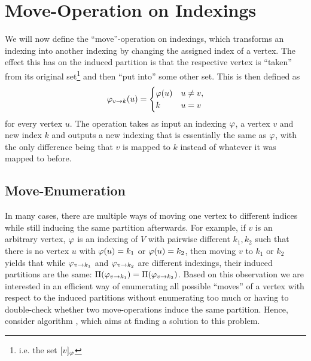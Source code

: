 \section{Move-Operation on Indexings}\label{sec:move-operation}

We will now define the ``move''-operation on indexings, which transforms an indexing into another indexing by changing the assigned index of a vertex. The effect this has on the induced partition is that the respective vertex is ``taken'' from its original set\footnote{i.e. the set $[v]_\varphi$} and then ``put into'' some other set. This is then defined as
\begin{equation} 
\varphi_{ v\rightarrow  k}(u) = \begin{cases}
    \varphi(u) & u \neq v, \\ 
    k & u = v
\end{cases} \label{eq:move-operation}
\end{equation} 
for every vertex $u$. The operation takes as input an indexing $\varphi$, a vertex $v$ and new index $k$ and outputs a new indexing that is essentially the same as $\varphi$, with the only difference being that $v$ is mapped to $k$ instead of whatever it was mapped to before.

\subsection{Move-Enumeration}

In many cases, there are multiple ways of moving one vertex to different indices while still inducing the same partition afterwards. For example, if $v$ is an arbitrary vertex, $\varphi$ is an indexing of $V$ with pairwise different $k_1,k_2$ such that there is no vertex $u$ with $\varphi(u) = k_1$ or $\varphi(u) = k_2$, then moving $v$ to $k_1$ or $k_2$ yields that while $\varphi_{v\rightarrow k_1}$ and $\varphi_{v\rightarrow k_2}$ are different indexings, their induced partitions are the same: $\Pi(\varphi_{v\rightarrow k_1}) = \Pi(\varphi_{v\rightarrow k_2})$. Based on this observation we are interested in an efficient way of enumerating all possible ``moves'' of a vertex with respect to the induced partitions without enumerating too much or having to double-check whether two move-operations induce the same partition. Hence, consider algorithm \emph{}, which aims at finding a solution to this problem.

